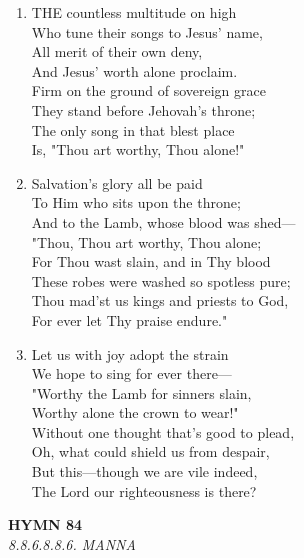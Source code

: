 \documentclass[11pt,a4paper]{article}
\begin{document}
\begin{enumerate}
    \item THE countless multitude on high \\
        Who tune their songs to Jesus' name, \\
        All merit of their own deny, \\
        And Jesus' worth alone proclaim. \\
        Firm on the ground of sovereign grace \\
        They stand before Jehovah's throne; \\
        The only song in that blest place \\
        Is, "Thou art worthy, Thou alone!"

    \item Salvation's glory all be paid \\
        To Him who sits upon the throne; \\
        And to the Lamb, whose blood was shed--- \\
        "Thou, Thou art worthy, Thou alone; \\
        For Thou wast slain, and in Thy blood \\
        These robes were washed so spotless pure; \\
        Thou mad'st us kings and priests to God, \\
        For ever let Thy praise endure."

    \item Let us with joy adopt the strain \\
        We hope to sing for ever there--- \\
        "Worthy the Lamb for sinners slain, \\
        Worthy alone the crown to wear!" \\
        Without one thought that's good to plead, \\
        Oh, what could shield us from despair, \\
        But this---though we are vile indeed, \\
        The Lord our righteousness is there?

\end{enumerate}

\newpage
\begin{center}
    {\Large \textbf{HYMN 84}}
    \\
    \textit{8.8.6.8.8.6. MANNA}
\end{center}
\vspace{1em}
\end{document}
